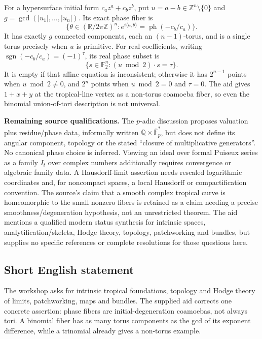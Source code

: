 \documentclass[11pt]{article}
\newcommand{\Z}{\mathbb{Z}}
\newcommand{\Q}{\mathbb{Q}}
\newcommand{\R}{\mathbb{R}}
\newcommand{\F}{\mathbb{F}}
\begin{document}
For a hypersurface initial form $c_a z^a+c_b z^b$, put $u=a-b\in\Z^n\setminus\{0\}$ and $g=\gcd(|u_1|,\ldots,|u_n|)$. Its exact phase fiber is
\[
 \{\theta\in(\R/2\pi\Z)^n:
      e^{i\langle u,\theta\rangle}
         =\operatorname{ph}(-c_b/c_a)\}.
\]
It has exactly $g$ connected components, each an $(n-1)$-torus, and is a single torus precisely when $u$ is primitive. For real coefficients, writing $\operatorname{sgn}(-c_b/c_a)=(-1)^\tau$, its real phase subset is
\[
 \{s\in\F_2^n:(u\bmod2)\cdot s=\tau\}.
\]
It is empty if that affine equation is inconsistent; otherwise it has $2^{n-1}$ points when $u\bmod2\ne0$, and $2^n$ points when $u\bmod2=0$ and $\tau=0$. The aid gives $1+x+y$ at the tropical-line vertex as a non-torus coamoeba fiber, so even the binomial union-of-tori description is not universal.

\textbf{Remaining source qualifications.} The $p$-adic discussion proposes valuation plus residue/phase data, informally written $\Q\times\overline{\F}_p^*$, but does not define its angular component, topology or the stated ``closure of multiplicative generators''. No canonical phase choice is inferred. Viewing an ideal over formal Puiseux series as a family $I_t$ over complex numbers additionally requires convergence or algebraic family data. A Hausdorff-limit assertion needs rescaled logarithmic coordinates and, for noncompact spaces, a local Hausdorff or compactification convention. The source's claim that a smooth complex tropical curve is homeomorphic to the small nonzero fibers is retained as a claim needing a precise smoothness/degeneration hypothesis, not an unrestricted theorem. The aid mentions a qualified modern status synthesis for intrinsic spaces, analytification/skeleta, Hodge theory, topology, patchworking and bundles, but supplies no specific references or complete resolutions for those questions here.
\subsection{Short English statement}
The workshop asks for intrinsic tropical foundations, topology and Hodge theory of limits, patchworking, maps and bundles. The supplied aid corrects one concrete assertion: phase fibers are initial-degeneration coamoebas, not always tori. A binomial fiber has as many torus components as the gcd of its exponent difference, while a trinomial already gives a non-torus example.
\end{document}
